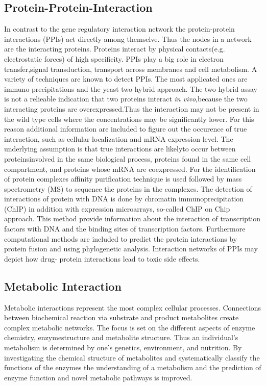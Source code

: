 \newpage

\subsection*{Protein-Protein-Interaction}
In contrast to the gene regulatory interaction network the protein-protein interactions (PPIs) act directly among themselve. Thus the nodes in a network are the interacting proteins. Proteins interact by physical contacts(e.g. electrostatic forces) of high specificity. PPIs play a big role in electron transfer,signal transduction, transport across membranes and cell metabolism. A variety of techniques are known to detect PPIs. The most applicated ones are immuno-precipitations and the yeast two-hybrid approach. The two-hybrid assay is not a relieable indication that two proteins interact \textit{in vivo},because the two interacting proteins are overexpressed.Thus the interaction may not be present in the wild type cells where the concentrations may be significantly lower. For this reason additional information are included to figure out the occurence of true interaction, such as cellular localization and mRNA expression level. The underlying assumption is that true interactions are likelyto occur between proteinsinvolved in the same biological process, proteins found in the same cell compartment, and proteins whose mRNA are coexpressed.
For the identification of protein complexes affinity purification technique is used followed by mass spectrometry (MS) to sequence the proteins in the complexes. The detection of interactions of protein with DNA is done by chromatin immunoprecipitation (ChIP) in addition with expression microarrays, so-called ChIP on Chip approach. This method provide information about the interaction of transcription factors with DNA and the binding sites of transcription factors. Furthermore computational methods are included to predict the protein interactions by protein fusion and using phylogenetic analysis. Interaction networks of PPIs may depict how drug- protein interactions lead to toxic side effects.
\citep{doi:10.1586/14789450.1.2.239}

\subsection*{Metabolic Interaction}
Metabolic interactions represent the most complex cellular processes. Connections between biochemical reaction via substrate and product metabolites create complex metabolic networks.
The focus is set on the different aspects of enzyme chemistry, enzymestructure and metabolite structure. Thus an individual's metabolism is determined by one's genetics, environment, and nutrition. By investigating the chemical structure of metabolites and systematically classify the functions of the enzymes the understanding of a metabolism and the prediction of enzyme function and novel metabolic pathways is improved.\citep{104(6):1777-1782}\citep{HATZIMANIKATIS2004300}


